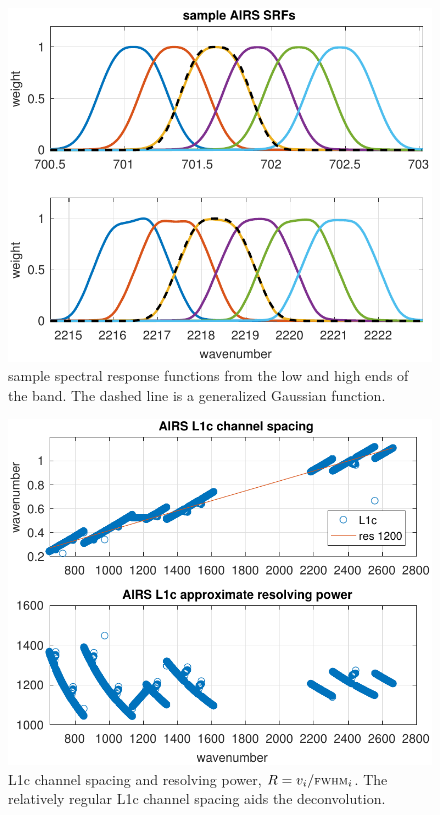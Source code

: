 \documentclass[10pt,twocolumn]{article}
\begin{document}
\begin{figure} %
  \centering
  \includegraphics[width=\linewidth]{figures/airs_sample_SRF.pdf}
  \caption{sample {\airs} spectral response functions from the low
    and high ends of the band.   The dashed line is a generalized
    Gaussian function.}
  \label{srfs1}
\end{figure}

\begin{figure} %
  \centering
  \includegraphics[width=\linewidth]{figures/airs_L1c_res.pdf}
  \caption{{\airs} L1c channel spacing and resolving power, $R =
    v_i/\mbox{\small\textsc{fwhm}}_i$.  The relatively regular L1c channel spacing aids
    the deconvolution.}
  \label{chan1}
\end{figure}
\end{document}
